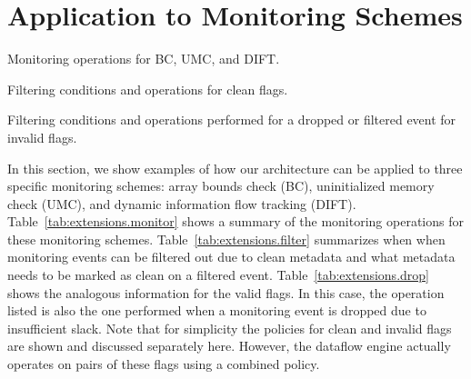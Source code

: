 \section{Application to Monitoring Schemes}
\label{sec:extensions}

\begin{table*}[tb]
  \begin{center}
    \begin{small}
    
    \end{small}
    \caption{Monitoring operations for BC, UMC, and DIFT.}
    \label{tab:extensions.monitor}
    \vspace{-0.2in}
  \end{center}
\end{table*}

\begin{table*}[tb]
  \begin{center}
    \begin{small}
    
    \end{small}
    \caption{Filtering conditions and operations for clean flags.}
    \label{tab:extensions.filter}
    \vspace{-0.2in}
  \end{center}
\end{table*}

\begin{table*}[tb]
  \begin{center}
    \begin{small}
    
    \end{small}
    \caption{Filtering conditions and operations performed for a dropped or filtered event for invalid flags.}
    \label{tab:extensions.drop}
    \vspace{-0.2in}
  \end{center}
\end{table*}

In this section, we show examples of how our architecture can be applied to
three specific monitoring schemes: array bounds check (BC), uninitialized
memory check (UMC), and dynamic information flow tracking (DIFT).
Table~\ref{tab:extensions.monitor} shows a summary of the monitoring operations for these
monitoring schemes. Table~\ref{tab:extensions.filter} summarizes when when
monitoring events can be filtered out due to clean metadata and what metadata
needs to be marked as clean on a filtered event.
Table~\ref{tab:extensions.drop} shows the analogous information for the valid
flags. In this case, the operation listed is also the one performed when a
monitoring event is dropped due to insufficient slack. Note that for simplicity
the policies for clean and invalid flags are shown and discussed separately
here. However, the dataflow engine actually operates on pairs of these flags
using a combined policy.

